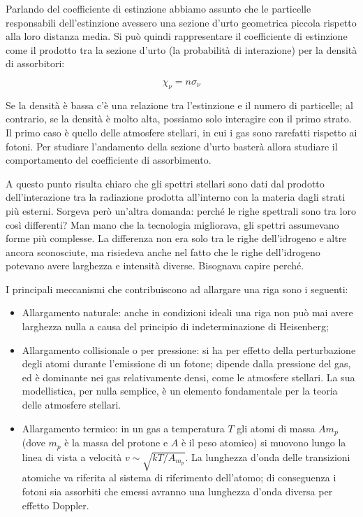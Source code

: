Parlando del coefficiente di estinzione abbiamo assunto che le particelle responsabili dell'estinzione avessero una sezione d'urto geometrica piccola rispetto alla loro distanza media. Si può quindi rappresentare il coefficiente di estinzione come il prodotto tra la sezione d'urto (la probabilità di interazione) per la densità di assorbitori:

\begin{equation*}
  \chi_{\nu} = n\sigma_{\nu}
\end{equation*}

Se la densità è bassa c'è una relazione tra l'estinzione e il numero di particelle; al contrario, se la densità è molto alta, possiamo solo interagire con il primo strato. Il primo caso è quello delle atmosfere stellari, in cui i gas sono rarefatti rispetto ai fotoni. Per studiare l'andamento della sezione d'urto basterà allora studiare il comportamento del coefficiente di assorbimento.

A questo punto risulta chiaro che gli spettri stellari sono dati dal prodotto dell'interazione tra la radiazione prodotta all'interno con la materia dagli strati più esterni. Sorgeva però un'altra domanda: perché le righe spettrali sono tra loro così differenti? Man mano che la tecnologia migliorava, gli spettri assumevano forme più complesse. La differenza non era solo tra le righe dell'idrogeno e altre ancora sconosciute, ma risiedeva anche nel fatto che le righe dell'idrogeno potevano avere larghezza e intensità diverse. Bisognava capire perché.

I principali meccanismi che contribuiscono ad allargare una riga sono i seguenti:

\begin{itemize}
  \item Allargamento naturale: anche in condizioni ideali una riga non può mai avere larghezza
  nulla a causa del principio di indeterminazione di Heisenberg;
  \item Allargamento collisionale o per pressione: si ha per effetto della perturbazione degli atomi durante l'emissione di un fotone; dipende dalla pressione del gas, ed è dominante nei gas relativamente densi, come le atmosfere stellari. La sua modellistica, per nulla semplice, è un elemento fondamentale per la teoria delle atmosfere stellari.
  \item Allargamento termico: in un gas a temperatura $T$ gli atomi di massa $A{m_{p}}$ (dove $m_p$ è la massa del protone e $A$ è il peso atomico) si muovono lungo la linea di vista a velocità $v \sim \sqrt{kT/A_{m_{p}}}$. La lunghezza d'onda delle transizioni atomiche va riferita al sistema di riferimento dell'atomo; di conseguenza i fotoni sia assorbiti che emessi avranno una lunghezza d'onda diversa per effetto Doppler.
\end{itemize}

